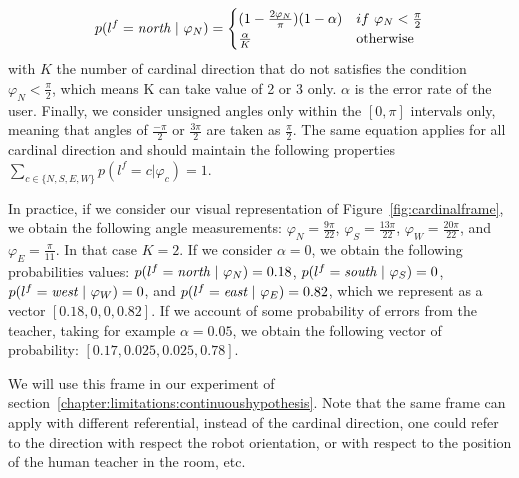 \begin{equation}
    p(l^f = \emph{north}~|~\varphi_N) = 
    \begin{cases}
    (1 - \frac{2 \varphi_N}{\pi}) (1-\alpha) & if~\varphi_N < \frac{\pi}{2}\\
        \frac{\alpha}{K}  & \text{otherwise}\\
   \end{cases}
   \label{eq:cardinalframe}
\end{equation}
with $K$ the number of cardinal direction that do not satisfies the condition $\varphi_N < \frac{\pi}{2}$, which means K can take value of 2 or 3 only. $\alpha$ is the error rate of the user. Finally, we consider unsigned angles only within the $[0, \pi]$ intervals only, meaning that angles of $\frac{-\pi}{2}$ or $\frac{3\pi}{2}$ are taken as $\frac{\pi}{2}$. The same equation applies for all cardinal direction and should maintain the following properties $\sum_{c \in \{N,S,E,W\}} p(l^f = c |\varphi_c) = 1$.

In practice, if we consider our visual representation of Figure~\ref{fig:cardinalframe}, we obtain the following angle measurements: $\varphi_N = \frac{9\pi}{22}$, $\varphi_S = \frac{13\pi}{22}$, $\varphi_W = \frac{20\pi}{22}$, and $\varphi_E = \frac{\pi}{11}$. In that case $K = 2$. If we consider $\alpha = 0$, we obtain the following probabilities values: $p(l^f = \emph{north}~|~\varphi_N) = 0.18$, $p(l^f = \emph{south}~|~\varphi_S) = 0$, $p(l^f = \emph{west}~|~\varphi_W) = 0$, and $p(l^f = \emph{east}~|~\varphi_E) = 0.82$, which we represent as a vector $[0.18,0,0,0.82]$. If we account of some probability of errors from the teacher, taking for example $\alpha = 0.05$, we obtain the following vector of probability: $[0.17, 0.025, 0.025,0.78]$.

We will use this frame in our experiment of section~\ref{chapter:limitations:continuoushypothesis}. Note that the same frame can apply with different referential, instead of the cardinal direction, one could refer to the direction with respect the robot orientation, or with respect to the position of the human teacher in the room, etc.



